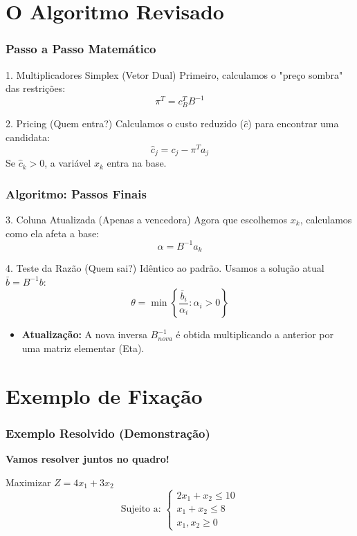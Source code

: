\section{O Algoritmo Revisado}

\begin{frame}
\frametitle{Passo a Passo Matemático}
\begin{block}{1. Multiplicadores Simplex (Vetor Dual)}
    Primeiro, calculamos o "preço sombra" das restrições:
    \[ \pi^T = c_B^T B^{-1} \]
\end{block}
\begin{block}{2. Pricing (Quem entra?)}
    Calculamos o custo reduzido ($\hat{c}$) para encontrar uma candidata:
    \[ \hat{c}_j = c_j - \pi^T a_j \]
    Se $\hat{c}_k > 0$, a variável $x_k$ entra na base.
\end{block}
\end{frame}

\begin{frame}
\frametitle{Algoritmo: Passos Finais}
\begin{block}{3. Coluna Atualizada (Apenas a vencedora)}
    Agora que escolhemos $x_k$, calculamos como ela afeta a base:
    \[ \alpha = B^{-1} a_k \]
\end{block}

\begin{block}{4. Teste da Razão (Quem sai?)}
    Idêntico ao padrão. Usamos a solução atual $\bar{b} = B^{-1}b$:
    \[ \theta = \min \left\{ \frac{\bar{b}_i}{\alpha_i} : \alpha_i > 0 \right\} \]
\end{block}

\begin{itemize}
    \item \textbf{Atualização:} A nova inversa $B^{-1}_{nova}$ é obtida multiplicando a anterior por uma matriz elementar (Eta).
\end{itemize}
\end{frame}

\section{Exemplo de Fixação}

\begin{frame}
\frametitle{Exemplo Resolvido (Demonstração)}
\textbf{Vamos resolver juntos no quadro!}

\vspace{0.5cm}
Maximizar $Z = 4x_1 + 3x_2$
\[ \text{Sujeito a: } \begin{cases} 2x_1 + x_2 \leq 10 \\ x_1 + x_2 \leq 8 \\ x_1, x_2 \geq 0 \end{cases} \]
\end{frame}

